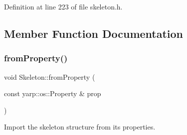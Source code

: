 Definition at line 223 of file skeleton.\+h.



\subsection{Member Function Documentation}
\mbox{\label{classassistive__rehab_1_1Skeleton_ac844f66503de87859833056dc33a835b}} 
\subsubsection{\texorpdfstring{fromProperty()}{fromProperty()}}
{\footnotesize\ttfamily void Skeleton\+::from\+Property (\begin{DoxyParamCaption}\item[{const yarp\+::os\+::\+Property \&}]{prop }\end{DoxyParamCaption})\hspace{0.3cm}{\ttfamily [virtual]}}



Import the skeleton structure from its properties. 


